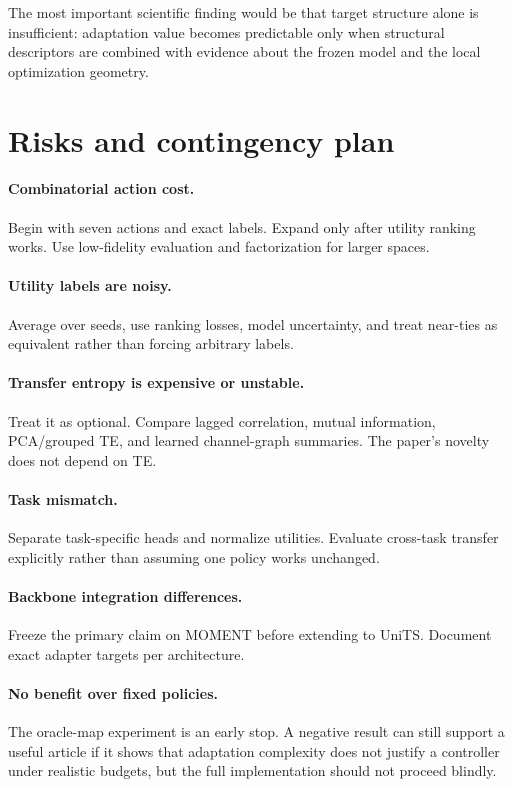 \documentclass[10pt]{article}
\begin{document}
The most important scientific finding would be that target structure alone is insufficient: adaptation value becomes predictable only when structural descriptors are combined with evidence about the frozen model and the local optimization geometry.

\section{Risks and contingency plan}

\paragraph{Combinatorial action cost.} Begin with seven actions and exact labels. Expand only after utility ranking works. Use low-fidelity evaluation and factorization for larger spaces.

\paragraph{Utility labels are noisy.} Average over seeds, use ranking losses, model uncertainty, and treat near-ties as equivalent rather than forcing arbitrary labels.

\paragraph{Transfer entropy is expensive or unstable.} Treat it as optional. Compare lagged correlation, mutual information, PCA/grouped TE, and learned channel-graph summaries. The paper's novelty does not depend on TE.

\paragraph{Task mismatch.} Separate task-specific heads and normalize utilities. Evaluate cross-task transfer explicitly rather than assuming one policy works unchanged.

\paragraph{Backbone integration differences.} Freeze the primary claim on MOMENT before extending to UniTS. Document exact adapter targets per architecture.

\paragraph{No benefit over fixed policies.} The oracle-map experiment is an early stop. A negative result can still support a useful article if it shows that adaptation complexity does not justify a controller under realistic budgets, but the full implementation should not proceed blindly.
\end{document}
